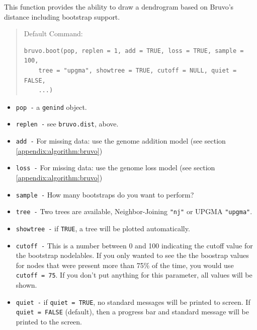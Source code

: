 \documentclass[letterpaper]{article}\usepackage[]{graphicx}\usepackage[]{color}
\makeatletter
\newenvironment{kframe}{%
 \def\at@end@of@kframe{}%
 \ifinner\ifhmode%
  \def\at@end@of@kframe{\end{minipage}}%
  \begin{minipage}{\columnwidth}%
 \fi\fi%
 \def\FrameCommand##1{\hskip\@totalleftmargin \hskip-\fboxsep
 \colorbox{shadecolor}{##1}\hskip-\fboxsep
     \hskip-\linewidth \hskip-\@totalleftmargin \hskip\columnwidth}%
 \MakeFramed {\advance\hsize-\width
   \@totalleftmargin\z@ \linewidth\hsize
   \@setminipage}}%
 {\par\unskip\endMakeFramed%
 \at@end@of@kframe}
\newenvironment{knitrout}{}{} %
\newcommand{\tab}{\hspace*{1em}}
\makeatother
\begin{document}
\tab\tab This function provides the ability to draw a dendrogram based on Bruvo's distance including bootstrap support. 
\begin{quote}
Default Command:
\begin{knitrout}
\color{fgcolor}\begin{kframe}
\begin{verbatim}
bruvo.boot(pop, replen = 1, add = TRUE, loss = TRUE, sample = 100, 
    tree = "upgma", showtree = TRUE, cutoff = NULL, quiet = FALSE, 
    ...)
\end{verbatim}
\end{kframe}
\end{knitrout}

\end{quote}
\begin{itemize}
  \item \texttt{pop -} a \texttt{genind} object.
  \item \texttt{replen -} see \texttt{bruvo.dist}, above.
  \item \texttt{add -} For missing data: use the genome addition model (see section \ref{appendix:algorithm:bruvo})
  \item \texttt{loss -} For missing data: use the genome loss model (see section \ref{appendix:algorithm:bruvo})
  \item \texttt{sample -} How many bootstraps do you want to perform? 
  \item \texttt{tree -} Two trees are available, Neighbor-Joining \texttt{"nj"} or UPGMA \texttt{"upgma"}.
  \item \texttt{showtree -} if \texttt{TRUE}, a tree will be plotted automatically.
  \item \texttt{cutoff -} This is a number between 0 and 100 indicating the cutoff value for the bootstrap nodelables. If you only wanted to see the the boostrap values for nodes that were present more than 75\% of the time, you would use \texttt{cutoff = 75}. If you don't put anything for this parameter, all values will be shown.
  \item \texttt{quiet -} if \texttt{quiet = TRUE}, no standard messages will be printed to screen. If \texttt{quiet = FALSE} (default), then a progress bar and standard message will be printed to the screen.
\end{itemize}
\end{document}
